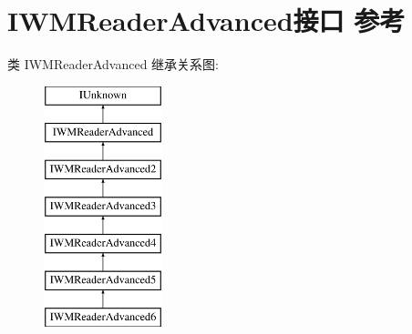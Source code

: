 \hypertarget{interface_i_w_m_reader_advanced}{}\section{I\+W\+M\+Reader\+Advanced接口 参考}
\label{interface_i_w_m_reader_advanced}
类 I\+W\+M\+Reader\+Advanced 继承关系图\+:\begin{figure}[H]
\begin{center}
\leavevmode
\includegraphics[height=7.000000cm]{interface_i_w_m_reader_advanced}
\end{center}
\end{figure}

